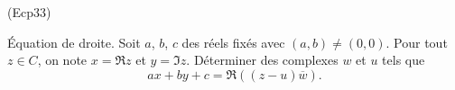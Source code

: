\begin{tiny}(Ecp33)\end{tiny} \'Equation de droite.\newline
Soit $a$, $b$, $c$ des réels fixés avec $(a,b)\neq(0,0)$. Pour tout $z\in C$, on note $x = \Re z$ et $y = \Im z$. Déterminer des complexes $w$ et $u$ tels que
\begin{displaymath}
 ax+by+c = \Re\left( (z-u)\overline{w}\right). 
\end{displaymath}
